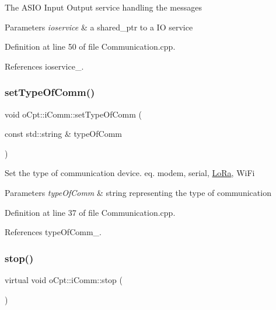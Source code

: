 The A\+S\+IO Input Output service handling the messages 
\begin{DoxyParams}{Parameters}
{\em ioservice} & a shared\+\_\+ptr to a IO service \\
\hline
\end{DoxyParams}


Definition at line 50 of file Communication.\+cpp.



References ioservice\+\_\+.

\hypertarget{classo_cpt_1_1i_comm_ad5b257586d4fb17bcdf075e2401312a6}{}\label{classo_cpt_1_1i_comm_ad5b257586d4fb17bcdf075e2401312a6} 
\subsubsection{\texorpdfstring{set\+Type\+Of\+Comm()}{setTypeOfComm()}}
{\footnotesize\ttfamily void o\+Cpt\+::i\+Comm\+::set\+Type\+Of\+Comm (\begin{DoxyParamCaption}\item[{const std\+::string \&}]{type\+Of\+Comm }\end{DoxyParamCaption})}

Set the type of communication device. eq. modem, serial, \hyperlink{classo_cpt_1_1_lo_ra}{Lo\+Ra}, Wi\+Fi 
\begin{DoxyParams}{Parameters}
{\em type\+Of\+Comm} & string representing the type of communication \\
\hline
\end{DoxyParams}


Definition at line 37 of file Communication.\+cpp.



References type\+Of\+Comm\+\_\+.

\hypertarget{classo_cpt_1_1i_comm_ad73564bd03146a576aaa37db1a38379f}{}\label{classo_cpt_1_1i_comm_ad73564bd03146a576aaa37db1a38379f} 
\subsubsection{\texorpdfstring{stop()}{stop()}}
{\footnotesize\ttfamily virtual void o\+Cpt\+::i\+Comm\+::stop (\begin{DoxyParamCaption}{ }\end{DoxyParamCaption})\hspace{0.3cm}{\ttfamily [pure virtual]}}

